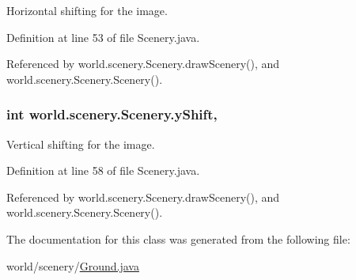 Horizontal shifting for the image. 



Definition at line 53 of file Scenery.\-java.



Referenced by world.\-scenery.\-Scenery.\-draw\-Scenery(), and world.\-scenery.\-Scenery.\-Scenery().

\hypertarget{a00024_ac9ca2c17cf6920deffe490c013b0e638}{
\subsubsection[{y\-Shift}]{\setlength{\rightskip}{0pt plus 5cm}int world.\-scenery.\-Scenery.\-y\-Shift\hspace{0.3cm}{\ttfamily [protected]}, {\ttfamily [inherited]}}}\label{a00024_ac9ca2c17cf6920deffe490c013b0e638}


Vertical shifting for the image. 



Definition at line 58 of file Scenery.\-java.



Referenced by world.\-scenery.\-Scenery.\-draw\-Scenery(), and world.\-scenery.\-Scenery.\-Scenery().



The documentation for this class was generated from the following file\-:\begin{DoxyCompactItemize}
\item 
world/scenery/\hyperlink{a00066}{Ground.\-java}\end{DoxyCompactItemize}
